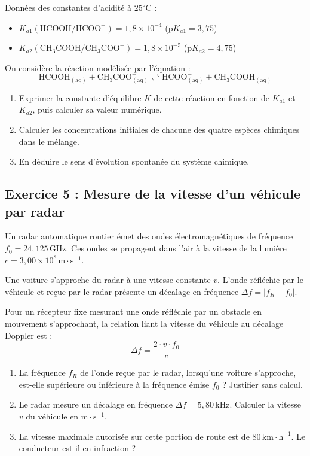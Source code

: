 \documentclass[12pt,a4paper]{article}
\begin{document}
Données des constantes d'acidité à $25^\circ\text{C}$ :
\begin{itemize}
    \item $K_{a1} (\text{HCOOH}/\text{HCOO}^-) = 1,8 \times 10^{-4}$ ($\text{p}K_{a1} = 3,75$)
    \item $K_{a2} (\text{CH}_3\text{COOH}/\text{CH}_3\text{COO}^-) = 1,8 \times 10^{-5}$ ($\text{p}K_{a2} = 4,75$)
\end{itemize}

On considère la réaction modélisée par l'équation :
\[ \text{HCOOH}_{(\text{aq})} + \text{CH}_3\text{COO}^-_{(\text{aq})} \rightleftharpoons \text{HCOO}^-_{(\text{aq})} + \text{CH}_3\text{COOH}_{(\text{aq})} \]

\begin{enumerate}
    \item Exprimer la constante d'équilibre $K$ de cette réaction en fonction de $K_{a1}$ et $K_{a2}$, puis calculer sa valeur numérique.
    \item Calculer les concentrations initiales de chacune des quatre espèces chimiques dans le mélange.
    \item En déduire le sens d'évolution spontanée du système chimique.
\end{enumerate}



\subsection*{Exercice 5 : Mesure de la vitesse d'un véhicule par radar}

Un radar automatique routier émet des ondes électromagnétiques de fréquence $f_0 = 24,125\,\text{GHz}$. Ces ondes se propagent dans l'air à la vitesse de la lumière $c = 3,00 \times 10^8\,\text{m}\cdot\text{s}^{-1}$.

Une voiture s'approche du radar à une vitesse constante $v$. L'onde réfléchie par le véhicule et reçue par le radar présente un décalage en fréquence $\Delta f = |f_R - f_0|$. 

Pour un récepteur fixe mesurant une onde réfléchie par un obstacle en mouvement s'approchant, la relation liant la vitesse du véhicule au décalage Doppler est :
\[ \Delta f = \frac{2 \cdot v \cdot f_0}{c} \]

\begin{enumerate}
    \item La fréquence $f_R$ de l'onde reçue par le radar, lorsqu'une voiture s'approche, est-elle supérieure ou inférieure à la fréquence émise $f_0$ ? Justifier sans calcul.
    \item Le radar mesure un décalage en fréquence $\Delta f = 5,80\,\text{kHz}$. Calculer la vitesse $v$ du véhicule en $\text{m}\cdot\text{s}^{-1}$.
    \item La vitesse maximale autorisée sur cette portion de route est de $80\,\text{km}\cdot\text{h}^{-1}$. Le conducteur est-il en infraction ?
\end{enumerate}
\end{document}
